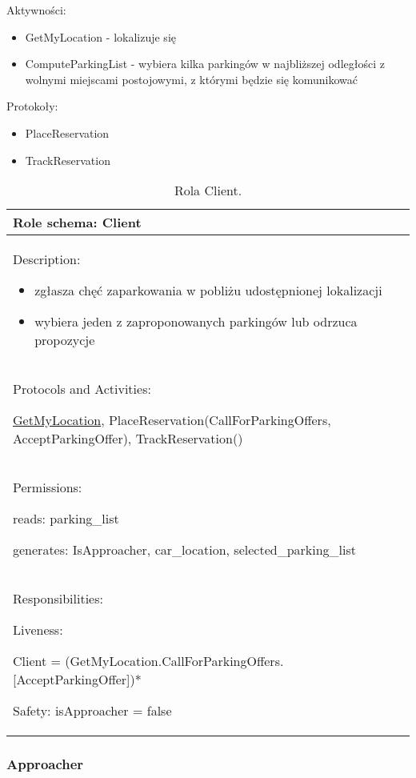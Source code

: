 Aktywności:
\begin{itemize}
    \item GetMyLocation - lokalizuje się
    \item ComputeParkingList - wybiera kilka parkingów w najbliższej odległości z wolnymi miejscami postojowymi, z którymi będzie się komunikować

\end{itemize}

Protokoły:
\begin{itemize}
    \item PlaceReservation
    \item TrackReservation
\end{itemize}


\begin{table}[!h] \label{tab:rola1} \centering
    \caption{Rola Client.}
    \begin{tabular} {| p{14cm} |} \hline
        Role schema: Client \\ \hline
        Description:

        \begin{itemize}
            \item zgłasza chęć zaparkowania w pobliżu udostępnionej lokalizacji
            \item wybiera jeden z zaproponowanych parkingów lub odrzuca propozycje
            
        \end{itemize} \\ \hline
        Protocols and Activities: 
        
        \ul{GetMyLocation}, PlaceReservation(CallForParkingOffers, AcceptParkingOffer), TrackReservation() \\ \hline
        Permissions:

        reads: parking\_list

        generates:  IsApproacher, car\_location, selected\_parking\_list \\ \hline
        Responsibilities:

        Liveness: 
        
        Client = (GetMyLocation.CallForParkingOffers.[AcceptParkingOffer])*


        Safety: isApproacher = false \\ \hline
    \end{tabular}
\end{table}

\newpage
\subsubsection{Approacher}

